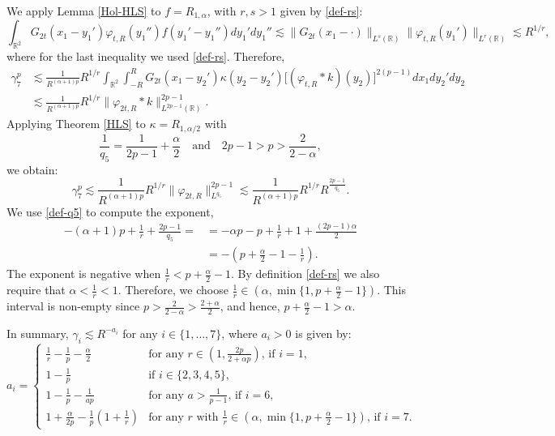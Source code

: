 \documentclass[12pt]{article}
\def\bR{\mathbb{R}}
\newcommand{\les}{\lesssim}
\def\k{\kappa}
\begin{document}
\begin{itemize}
We apply Lemma \ref{Hol-HLS} to $f = R_{1,\alpha}$, with $r,s>1$ given by \eqref{def-rs}:
\[
\int_{\bR^2}  G_{2t}(x_1-y_1') \varphi_{t,R}(y_1'') f(y_1'-y_1'') dy_1' dy_1''  \les \|G_{2t}(x_1-\cdot)\|_{L^{s}(\bR)}\|\varphi_{t,R}(y_1')\|_{L^{r}(\bR)}  \les R^{1/r},
\]
where for the last inequality we used \eqref{def-rs}. Therefore, 
\begin{align*}
\gamma_7^p & \les \frac{1}{R^{(\alpha+1)p}}R^{1/r} \int_{\bR^2} \int_{-R}^{R} G_{2t}(x_1-y_2')\k(y_2-y_2') \big[ (\varphi_{t,R}*k)(y_2)\big]^{2(p-1)} dx_1 dy_2' dy_2 
\\
& \les \frac{1}{R^{(\alpha+1)p}}R^{1/r} \| \varphi_{2t,R}*k\|_{L^{2p-1}(\bR)}^{2p-1}.
\end{align*}
Applying Theorem \ref{HLS} to $\k = R_{1,\alpha/2}$ with 
\begin{equation}
\label{def-q5}
\frac{1}{q_5}=\frac{1}{2p-1}+\frac{\alpha}{2} \quad \mbox{and} \quad 2p-1>p>\frac{2}{2-\alpha},
\end{equation}
we obtain:
\begin{equation*}
\gamma_7^p \les \frac{1}{R^{(\alpha+1)p}}R^{1/r} \| \varphi_{2t,R}\|_{L^{q_5}}^{2p-1} \les \frac{1}{R^{(\alpha+1)p}}R^{1/r} R^{\frac{2p-1}{q_5}}.
\end{equation*}
We use \eqref{def-q5} to compute the exponent, 
\begin{align*}
-(\alpha+1)p + \frac{1}{r} + \frac{2p-1}{q_5}=
& = -\alpha p-p + \frac{1}{r} + 1 + \frac{(2p-1)\alpha}{2} 
\\
& = -\left(p+ \frac{\alpha}{2} -1 -\frac{1}{r}\right).
\end{align*}
The exponent is negative when $\frac{1}{r} < p + \frac{\alpha}{2} - 1$. By definition \eqref{def-rs} we also require that $\alpha < \frac1r < 1$. Therefore, we choose $\frac{1}{r} \in (\alpha, \min \{1, p + \frac{\alpha}{2} - 1\})$. This interval is non-empty since $p>\frac{2}{2-\alpha}>\frac{2+\alpha}{2}$, and hence, $p+\frac{\alpha}{2}-1>\alpha$.

In summary, $\gamma_i \les R^{-a_i}$ for any $i \in \{1,\ldots,7\}$, where $a_i>0$ is given by:
\[
a_i=
\left\{
\begin{array}{ll} 
\frac{1}{r}-\frac{1}{p}-\frac{\alpha}{2} & \mbox{for any $r \in (1,\frac{2p}{2+\alpha p})$, if $i=1$, } \\
1-\frac{1}{p} & \mbox{if $i \in \{2,3,4,5\}$,} \\
1-\frac{1}{p} -\frac{1}{ap} & \mbox{for any $a>\frac{1}{p-1}$, if $i=6$,}\\
1 + \frac{\alpha}{2p} - \frac{1}{p}(1+\frac{1}{r}) & \mbox{for any $r$ with $\frac{1}{r} \in (\alpha, \min \{1, p + \frac{\alpha}{2} - 1\})$, if $i=7$.}
\end{array} \right. 
\]


\end{itemize}
\end{document}
